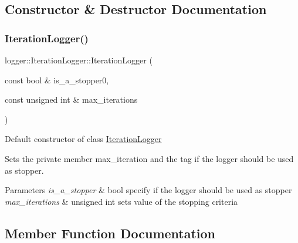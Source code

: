 \subsection{Constructor \& Destructor Documentation}
\mbox{\label{classlogger_1_1_iteration_logger_a571269a473e45ed773685092fab123c6}} 
\subsubsection{\texorpdfstring{Iteration\+Logger()}{LoggerIteration()}}
{\footnotesize\ttfamily logger\+::\+Iteration\+Logger\+::\+Iteration\+Logger (\begin{DoxyParamCaption}\item[{const bool \&}]{is\+\_\+a\+\_\+stopper0,  }\item[{const unsigned int \&}]{max\+\_\+iterations }\end{DoxyParamCaption})}



Default constructor of class {\ttfamily \mbox{\hyperlink{classlogger_1_1_iteration_logger}{Iteration\+Logger}}} 

Sets the private member {\ttfamily max\+\_\+iteration} and the tag if the logger should be used as stopper.


\begin{DoxyParams}{Parameters}
{\em is\+\_\+a\+\_\+stopper} & {\ttfamily bool} specify if the logger should be used as stopper \\
\hline
{\em max\+\_\+iterations} & {\ttfamily unsigned int} sets value of the stopping criteria \\
\hline
\end{DoxyParams}


\subsection{Member Function Documentation}
\mbox{\label{classlogger_1_1_iteration_logger_a7439c16a1482ad8c09f8ab37baf45690}} 
